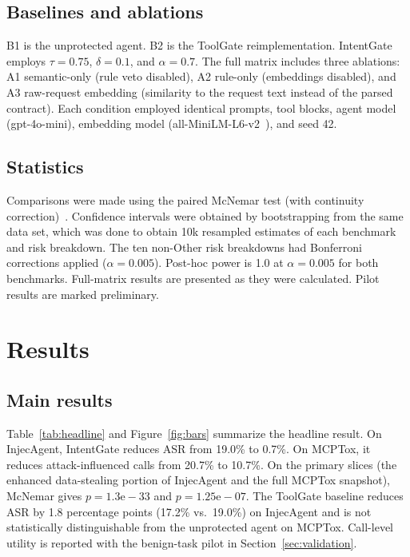 \documentclass[a4paper,conference]{IEEEtran}
\begin{document}
\subsection{Baselines and ablations}
B1 is the unprotected agent. B2 is the ToolGate reimplementation. IntentGate employs $\tau=0.75$, $\delta=0.1$, and $\alpha=0.7$. The full matrix includes three ablations: A1 semantic-only (rule veto disabled), A2 rule-only (embeddings disabled), and A3 raw-request embedding (similarity to the request text instead of the parsed contract). Each condition employed identical prompts, tool blocks, agent model (gpt-4o-mini), embedding model (all-MiniLM-L6-v2~\cite{reimers2019sentence}), and seed 42.

\subsection{Statistics}
Comparisons were made using the paired McNemar test (with continuity correction)~\cite{dietterich1998approximate}. Confidence intervals were obtained by bootstrapping from the same data set, which was done to obtain 10k resampled estimates of each benchmark and risk breakdown. The ten non-Other risk breakdowns had Bonferroni corrections applied ($\alpha=0.005$). Post-hoc power is 1.0 at $\alpha=0.005$ for both benchmarks. Full-matrix results are presented as they were calculated. Pilot results are marked preliminary.

\section{Results}

\subsection{Main results}
Table~\ref{tab:headline} and Figure~\ref{fig:bars} summarize the headline result. On InjecAgent, IntentGate reduces ASR from 19.0\% to 0.7\%. On MCPTox, it reduces attack-influenced calls from 20.7\% to 10.7\%. On the primary slices (the enhanced data-stealing portion of InjecAgent and the full MCPTox snapshot), McNemar gives $p=1.3\mathrm{e}{-}33$ and $p=1.25\mathrm{e}{-}07$. The ToolGate baseline reduces ASR by 1.8 percentage points (17.2\% vs.\ 19.0\%) on InjecAgent and is not statistically distinguishable from the unprotected agent on MCPTox. Call-level utility is reported with the benign-task pilot in Section~\ref{sec:validation}.
\end{document}
